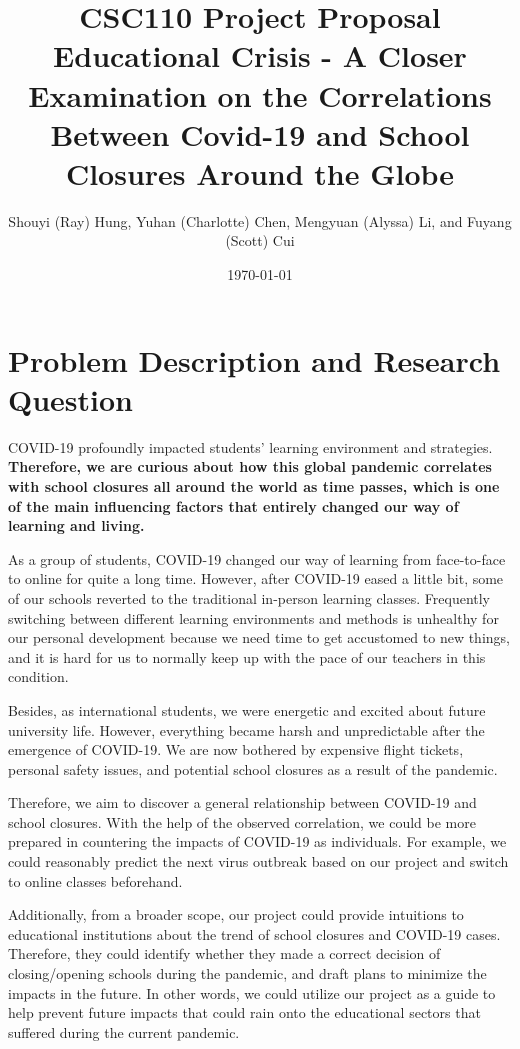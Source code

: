 \documentclass[fontsize=11pt]{article}
\title{CSC110 Project Proposal\\ Educational Crisis - A Closer Examination on the Correlations Between Covid-19 and School Closures Around the Globe}
\author{Shouyi (Ray) Hung, Yuhan (Charlotte) Chen, Mengyuan (Alyssa) Li, and Fuyang (Scott) Cui}
\date{\today}
\begin{document}
\maketitle

\section*{Problem Description and Research Question}

COVID-19 profoundly impacted students’ learning environment and strategies. \textbf{Therefore, we are curious about how this global pandemic correlates with school closures all around the world as time passes, which is one of the main influencing factors that entirely changed our way of learning and living.}

As a group of students, COVID-19 changed our way of learning from face-to-face to online for quite a long time. However, after COVID-19 eased a little bit, some of our schools reverted to the traditional in-person learning classes. Frequently switching between different learning environments and methods is unhealthy for our personal development because we need time to get accustomed to new things, and it is hard for us to normally keep up with the pace of our teachers in this condition.

Besides, as international students, we were energetic and excited about future university life. However, everything became harsh and unpredictable after the emergence of COVID-19. We are now bothered by expensive flight tickets, personal safety issues, and potential school closures as a result of the pandemic.

Therefore, we aim to discover a general relationship between COVID-19 and school closures. With the help of the observed correlation, we could be more prepared in countering the impacts of COVID-19 as individuals. For example, we could reasonably predict the next virus outbreak based on our project and switch to online classes beforehand.

Additionally, from a broader scope, our project could provide intuitions to educational institutions about the trend of school closures and COVID-19 cases. Therefore, they could identify whether they made a correct decision of closing/opening schools during the pandemic, and draft plans to minimize the impacts in the future. In other words, we could utilize our project as a guide to help prevent future impacts that could rain onto the educational sectors that suffered during the current pandemic.
\end{document}

